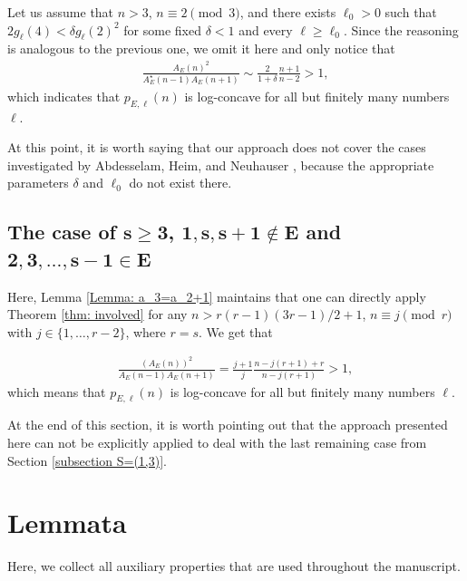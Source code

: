 \documentclass[12pt]{amsart}
\theoremstyle{definition}
\theoremstyle{remark}
\numberwithin{theorem}{section} \numberwithin{equation}{section}
\begin{document}
Let us assume that $n>3$, $n\equiv2\pmod{3}$, and there exists $\ell_0>0$ such that $2g_\ell(4)<\delta
g_{\ell }\left( 2\right)^{2}
$ for some fixed $\delta<1$ and every $\ell\geq\ell_0$. Since the reasoning is analogous to the previous one, we omit it here and only notice that
\begin{align*}
\frac{A_E(n)^2}{A_E^\star(n-1)A_E(n+1)}\sim\frac{2}{1+\delta}\frac{n+1}{n-2}>1,
\end{align*}
which indicates that $p_{E,\ell }\left( n\right)
$ is log-concave for all but finitely many numbers $\ell$.

At this point, it is worth saying that our approach does not cover the cases investigated by Abdesselam, Heim, and Neuhauser \cite{AHN24, HN22}, because the appropriate parameters $\delta$ and $\ell_0$ do not exist there.


\subsection{The case of $\mathbf{s\geq3}$, $\mathbf{1,s,s+1 \not\in E}$ and $\mathbf{2,3,\ldots,s-1 \in E}$}\label{problematic subsection S=(1,r,r+1)}

Here, Lemma \ref{Lemma: a_3=a_2+1} maintains that one can directly apply Theorem \ref{thm: involved} for any  $n>r(r-1)(3r-1)/2+1$, $n\equiv j\pmod{r} $ with $j\in\{1,\ldots,r-2\}$, where $r=s$. We get that

\begin{align*}
\frac{\left( A_{E}\left( n\right) \right) ^{2}
}{A_E(n-1)A_E(n+1)}=\frac{j+1}{j}\frac{n-j(r+1)+r}{n-j(r+1)}>1,
\end{align*}
which means that $p_{E,\ell }(n)
$ is log-concave for all but finitely many numbers $\ell$.


At the end of this section, it is worth pointing out that the approach presented here can not be explicitly applied to deal with the last remaining case from Section \ref{subsection S=(1,3)}.


\section{Lemmata}

Here, we collect all auxiliary properties that are used throughout the manuscript.
\end{document}
